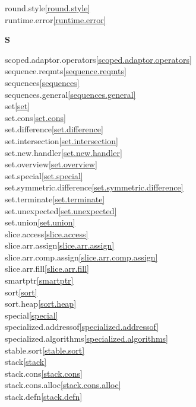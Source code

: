 \begin{multicols}{2}
round.style\quad\ref{round.style}\\
runtime.error\quad\ref{runtime.error}\\
\par \textbf{S}\par
scoped.adaptor.operators\quad\ref{scoped.adaptor.operators}\\
sequence.reqmts\quad\ref{sequence.reqmts}\\
sequences\quad\ref{sequences}\\
sequences.general\quad\ref{sequences.general}\\
set\quad\ref{set}\\
set.cons\quad\ref{set.cons}\\
set.difference\quad\ref{set.difference}\\
set.intersection\quad\ref{set.intersection}\\
set.new.handler\quad\ref{set.new.handler}\\
set.overview\quad\ref{set.overview}\\
set.special\quad\ref{set.special}\\
set.symmetric.difference\quad\ref{set.symmetric.difference}\\
set.terminate\quad\ref{set.terminate}\\
set.unexpected\quad\ref{set.unexpected}\\
set.union\quad\ref{set.union}\\
slice.access\quad\ref{slice.access}\\
slice.arr.assign\quad\ref{slice.arr.assign}\\
slice.arr.comp.assign\quad\ref{slice.arr.comp.assign}\\
slice.arr.fill\quad\ref{slice.arr.fill}\\
smartptr\quad\ref{smartptr}\\
sort\quad\ref{sort}\\
sort.heap\quad\ref{sort.heap}\\
special\quad\ref{special}\\
specialized.addressof\quad\ref{specialized.addressof}\\
specialized.algorithms\quad\ref{specialized.algorithms}\\
stable.sort\quad\ref{stable.sort}\\
stack\quad\ref{stack}\\
stack.cons\quad\ref{stack.cons}\\
stack.cons.alloc\quad\ref{stack.cons.alloc}\\
stack.defn\quad\ref{stack.defn}\\

\end{multicols}
